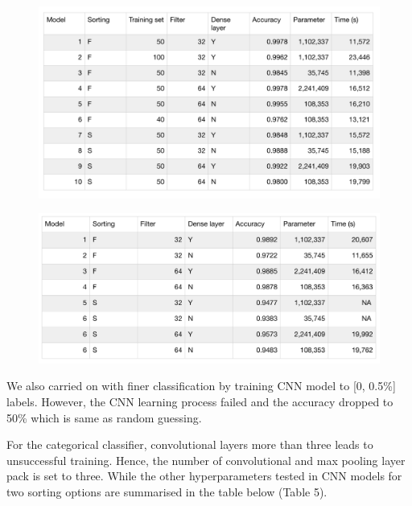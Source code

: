 \documentclass[a4paper,12pt,oneside]{extarticle}
\begin{document}
\begin{figure}[H] 
  \captionsetup{singlelinecheck = false, justification=justified}
  \centering
  \includegraphics[trim = 0 5mm 0 5mm, clip,width=1\textwidth]{table3.png}
\end{figure}

\begin{figure}[H] 
  \captionsetup{singlelinecheck = false, justification=justified}
  \centering
  \includegraphics[trim = 0 5mm 0 5mm, clip,width=1\textwidth]{table4.png}
\end{figure}


We also carried on with finer classification by training CNN model to [0, 0.5\%] labels. However, the CNN learning process failed and the accuracy dropped to 50\% which is same as random guessing.  
\par
For the categorical classifier, convolutional layers more than three leads to unsuccessful training. Hence, the number of convolutional and max pooling layer pack is set to three. While the other hyperparameters tested in CNN models for two sorting options are summarised in the table below (Table 5).
\end{document}
